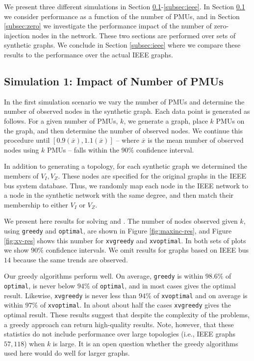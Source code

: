 {We present three different simulations in Section \ref{subsec:synth}-\ref{subsec:ieee}. 
In Section \ref{subsec:synth} we consider performance as a function of the number of PMUs, and in Section \ref{subsec:zero} we investigate the performance impact of the number of zero-injection nodes in the network. These two sections are performed over sets of synthetic graphs. We conclude in Section \ref{subsec:ieee} where we compare these results to the performance over the actual IEEE graphs.

\subsection{Simulation 1: Impact of Number of PMUs}
\label{subsec:synth}

In the first simulation scenario we vary the number of PMUs and determine the number of observed nodes in the synthetic graph.  %
Each data point is generated as follows. For a given number of PMUs, $k$, we generate a graph, place $k$ PMUs on the graph, and then determine the number of observed nodes. 
We continue this procedure until $[0.9(\overline{x}),1.1(\overline{x})]$ -- where $\overline{x}$ is the mean number of observed nodes using $k$ PMUs -- falls within the $90\%$ confidence interval.

In addition to generating a topology, for each synthetic graph we determined the members of $V_I, V_Z$. These nodes are specified for the original graphs in the IEEE bus system database. Thus, 
we randomly map each node in the IEEE network to a node in the synthetic network with the same degree, and then match their membership to either $V_I$ or $V_Z$.

We present here results for solving \maxinc and \xvalparts.  The number of nodes observed given $k$, using {\tt greedy} and {\tt optimal}, are shown in Figure \ref{fig:maxinc-res}, and Figure \ref{fig:xv-res} shows this number for {\tt xvgreedy} and {\tt xvoptimal}. In both sets of plots we show $90\%$
confidence intervals. We omit results for graphs based on IEEE bus $14$ because the same trends are observed.

Our greedy algorithms perform well. On average, {\tt greedy} is within $98.6\%$ of {\tt optimal},
is never below $94\%$ of {\tt optimal}, and in most cases gives the optimal result.
Likewise, {\tt xvgreedy} is never less than $94 \%$ of {\tt xvoptimal} and on average is within $97\%$ of {\tt xvoptimal}. In about about half the cases {\tt xvgreedy} gives the optimal result.
These results suggest that despite the complexity of the problems, a greedy approach can return high-quality results. Note, however, that these statistics do not include performance over
large topologies (i.e., IEEE graphs $57, 118$) when $k$ is large.  It is an open question whether the greedy algorithms used here would do well for larger graphs.

}

